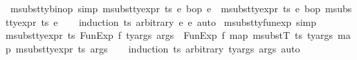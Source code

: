 \begin{isabellebody}
\endisatagproof
{\isafoldproof}%
%
\isadelimproof
\isanewline
%
\endisadelimproof
\isanewline
{}\isamarkupfalse%
\ msubst{\isacharunderscore}{\kern0pt}ty{\isacharunderscore}{\kern0pt}binop\ {\isacharbrackleft}{\kern0pt}simp{\isacharbrackright}{\kern0pt}{\isacharcolon}{\kern0pt}\ {\isachardoublequoteopen}msubst{\isacharunderscore}{\kern0pt}ty{\isacharunderscore}{\kern0pt}expr\ ts\ {\isacharparenleft}{\kern0pt}e{}\ {\isasymguillemotleft}bop{\isasymguillemotright}\ e{}{\isacharparenright}{\kern0pt}\ {\isacharequal}{\kern0pt}\ {\isacharparenleft}{\kern0pt}msubst{\isacharunderscore}{\kern0pt}ty{\isacharunderscore}{\kern0pt}expr\ ts\ e{}{\isacharparenright}{\kern0pt}\ {\isasymguillemotleft}bop{\isasymguillemotright}\ {\isacharparenleft}{\kern0pt}msubst{\isacharunderscore}{\kern0pt}ty{\isacharunderscore}{\kern0pt}expr\ ts\ e{}{\isacharparenright}{\kern0pt}{\isachardoublequoteclose}\isanewline
%
\isadelimproof
\ \ %
\endisadelimproof
%
\isatagproof
{}\isamarkupfalse%
\ {\isacharparenleft}{\kern0pt}induction\ ts\ arbitrary{\isacharcolon}{\kern0pt}\ e{}\ e{}{\isacharsemicolon}{\kern0pt}\ auto{\isacharparenright}{\kern0pt}%
\endisatagproof
{\isafoldproof}%
%
\isadelimproof
\isanewline
%
\endisadelimproof
\isanewline
\isanewline
\isanewline
{}\isamarkupfalse%
\ msubst{\isacharunderscore}{\kern0pt}ty{\isacharunderscore}{\kern0pt}funexp\ {\isacharbrackleft}{\kern0pt}simp{\isacharbrackright}{\kern0pt}{\isacharcolon}{\kern0pt}\ \isanewline
{\isachardoublequoteopen}msubst{\isacharunderscore}{\kern0pt}ty{\isacharunderscore}{\kern0pt}expr\ ts\ {\isacharparenleft}{\kern0pt}FunExp\ f\ ty{\isacharunderscore}{\kern0pt}args\ args{\isacharparenright}{\kern0pt}\ {\isacharequal}{\kern0pt}\ {\isacharparenleft}{\kern0pt}FunExp\ f\ {\isacharparenleft}{\kern0pt}map\ {\isacharparenleft}{\kern0pt}msubstT\ ts{\isacharparenright}{\kern0pt}\ ty{\isacharunderscore}{\kern0pt}args{\isacharparenright}{\kern0pt}\ {\isacharparenleft}{\kern0pt}map\ {\isacharparenleft}{\kern0pt}msubst{\isacharunderscore}{\kern0pt}ty{\isacharunderscore}{\kern0pt}expr\ ts{\isacharparenright}{\kern0pt}\ args{\isacharparenright}{\kern0pt}{\isacharparenright}{\kern0pt}{\isachardoublequoteclose}\isanewline
%
\isadelimproof
\ \ %
\endisadelimproof
%
\isatagproof
{}\isamarkupfalse%
\ {\isacharparenleft}{\kern0pt}induction\ ts\ arbitrary{\isacharcolon}{\kern0pt}\ ty{\isacharunderscore}{\kern0pt}args\ args{\isacharsemicolon}{\kern0pt}\ auto{\isacharparenright}{\kern0pt}%
\endisatagproof

\end{isabellebody}
